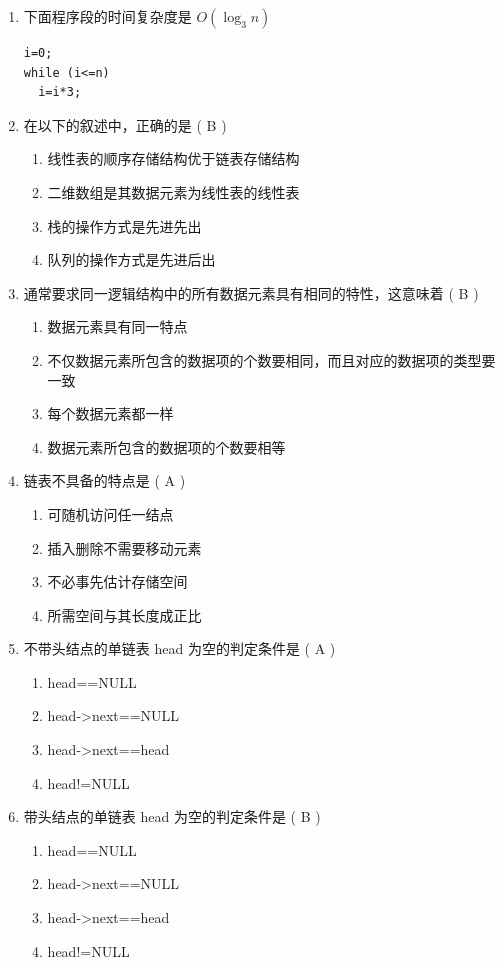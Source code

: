 \documentclass[12pt, a4paper]{article}
\begin{document}
\begin{enumerate}[label=\arabic*.]
    \item 下面程序段的时间复杂度是 $O(\log_3 n)$
    \begin{verbatim}
i=0;
while (i<=n)
  i=i*3;
    \end{verbatim}

    \item 在以下的叙述中，正确的是 ( B )
    \begin{enumerate}
        \item 线性表的顺序存储结构优于链表存储结构
        \item 二维数组是其数据元素为线性表的线性表
        \item 栈的操作方式是先进先出
        \item 队列的操作方式是先进后出
    \end{enumerate}

    \item 通常要求同一逻辑结构中的所有数据元素具有相同的特性，这意味着 ( B )
    \begin{enumerate}
        \item 数据元素具有同一特点
        \item 不仅数据元素所包含的数据项的个数要相同，而且对应的数据项的类型要一致
        \item 每个数据元素都一样
        \item 数据元素所包含的数据项的个数要相等
    \end{enumerate}

    \item 链表不具备的特点是 ( A )
    \begin{enumerate}
        \item 可随机访问任一结点
        \item 插入删除不需要移动元素
        \item 不必事先估计存储空间
        \item 所需空间与其长度成正比
    \end{enumerate}

    \item 不带头结点的单链表 head 为空的判定条件是 ( A )
    \begin{enumerate}
        \item head==NULL
        \item head->next==NULL
        \item head->next==head
        \item head!=NULL
    \end{enumerate}

    \item 带头结点的单链表 head 为空的判定条件是 ( B )
    \begin{enumerate}
        \item head==NULL
        \item head->next==NULL
        \item head->next==head
        \item head!=NULL
    \end{enumerate}


\end{enumerate}
\end{document}
